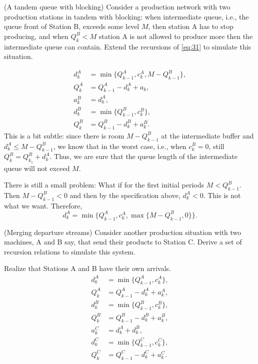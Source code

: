 \begin{question} (A tandem queue with blocking)
  Consider a production network with two production stations in tandem
  with blocking: when intermediate queue, i.e., the queue front of
  Station B, exceeds some level $M$, then station A has to stop
  producing, and when $Q^B_k < M$ station A is not allowed to produce
  more then the intermediate queue can contain. Extend the recursions
  of \eqref{eq:31} to simulate this situation.
\begin{solution}
\begin{equation}
  \begin{split}
    d^A_k &= \min\{Q_{k-1}^A, c_k^A, M-Q^B_{k-1}\}, \\
    Q_k^A &= Q_{k-1}^A -d_k^A + a_k, \\
    a_k^B &= d_{k}^A,\\
    d^B_k &= \min\{Q_{k-1}^B, c_k^B\}, \\
    Q_k^B &= Q_{k-1}^B -d_k^B + a_k^B.
  \end{split}
\end{equation}
This is a bit subtle: since there is room $M-Q^B_{k-1}$ at the
intermediate buffer and $d_k^A \leq M-Q^B_{k-1}$, we know that in the
worst case, i.e., when $c_k^B=0$, still $Q^B_k = Q_{k_1}^B +
d_k^A$.
Thus, we are sure that the queue length of the intermediate queue will
not exceed $M$.

There is still  a small problem: What if for the first initial periods  $M<Q^B_{k-1}$. Then $M-Q^B_{k-1}<0$ and then by the specification above, $d_k^A < 0$. This is not what we want. Therefore, 
\begin{equation*}
  d^A_k = \min\{Q_{k-1}^A, c_k^A, \max\{M-Q^B_{k-1}, 0\}\}.
\end{equation*}
\end{solution}
\end{question}

\begin{question} (Merging departure streams)
  Consider another production situation with two machines, A and B
  say, that send their products to Station C. Derive a set of
  recursion relations to simulate this system. 
\begin{solution}
Realize that Stations A and B have their own arrivals. 
\begin{equation}
  \begin{split}
    d^A_k &= \min\{Q_{k-1}^A, c_k^A\}, \\
    Q_k^A &= Q_{k-1}^A -d_k^A + a_k^A, \\
    d^B_k &= \min\{Q_{k-1}^B, c_k^B\}, \\
    Q_k^B &= Q_{k-1}^B -d_k^B + a_k^B, \\
    a_k^C &= d_{k}^A+d_{k}^B,\\
    d^C_k &= \min\{Q_{k-1}^C, c_k^C\}, \\
    Q_k^C &= Q_{k-1}^C -d_k^C + a_k^C.
  \end{split}
\end{equation}
\end{solution}
\end{question}

